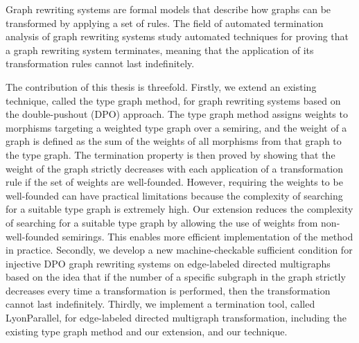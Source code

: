 Graph rewriting systems are formal models that describe how graphs can be transformed by applying a set of rules. The field of automated termination analysis of graph rewriting systems study automated techniques for proving that a graph rewriting system terminates, meaning that the application of its transformation rules cannot last indefinitely. 

The contribution of this thesis is threefold.
Firstly, we extend an existing technique, called the type graph method, for graph rewriting systems based on the double-pushout (DPO) approach. The type graph method assigns weights to morphisms targeting a weighted type graph over a semiring, and the weight of a graph is defined as the sum of the weights of all morphisms from that graph to the type graph. The termination property is then proved by showing that the weight of the graph strictly decreases with each application of a transformation rule if the set of weights are well-founded. However, requiring the weights to be well-founded can have practical limitations because the complexity of searching for a suitable type graph is extremely high.
Our extension reduces the complexity of searching for a suitable type graph by allowing the use of weights from non-well-founded semirings. This enables more efficient implementation of the method in practice.
Secondly, we develop a new machine-checkable sufficient condition
for injective DPO graph rewriting systems on edge-labeled directed multigraphs based on the idea that if the number of a specific subgraph in the graph strictly decreases every time a transformation is performed, then the transformation cannot last indefinitely.
Thirdly, we implement a termination tool, called LyonParallel, for edge-labeled directed multigraph transformation, including the existing
type graph method and our extension, and our technique.


